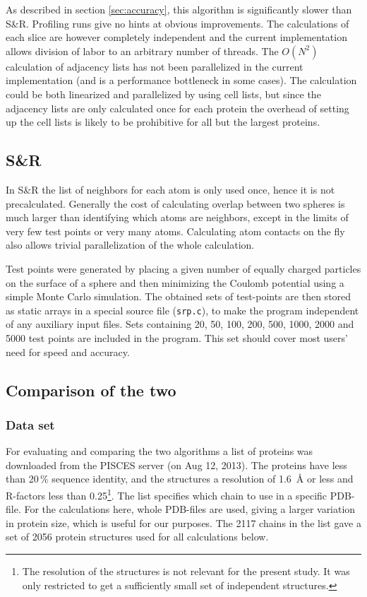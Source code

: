 \documentclass[a4paper,11pt]{article}
\begin{document}
As described in section \ref{sec:accuracy}, this algorithm is
significantly slower than S\&R. Profiling runs give no hints at
obvious improvements. The calculations of each slice are however
completely independent and the current implementation allows division
of labor to an arbitrary number of threads. The $O(N^2)$ calculation
of adjacency lists has not been parallelized in the current
implementation (and is a performance bottleneck in some cases). The
calculation could be both linearized and parallelized by using cell
lists, but since the adjacency lists are only calculated once for each
protein the overhead of setting up the cell lists is likely to be
prohibitive for all but the largest proteins.

\subsection{S\&R}

In S\&R the list of neighbors for each atom is only used once, hence
it is not precalculated. Generally the cost of calculating overlap
between two spheres is much larger than identifying which atoms are
neighbors, except in the limits of very few test points or very many
atoms. Calculating atom contacts on the fly also allows trivial
parallelization of the whole calculation.

Test points were generated by placing a given number of equally
charged particles on the surface of a sphere and then minimizing the
Coulomb potential using a simple Monte Carlo simulation. The obtained
sets of test-points are then stored as static arrays in a special
source file (\texttt{srp.c}), to make the program independent of any
auxiliary input files. Sets containing 20, 50, 100, 200, 500, 1000,
2000 and 5000 test points are included in the program. This set should
cover most users' need for speed and accuracy.

\subsection{Comparison of the two}\label{sec:compare}

\subsubsection{Data set}\label{sec:dataset}

For evaluating and comparing the two algorithms a list of proteins was
downloaded from the PISCES server \cite{PISCES} (on Aug 12, 2013). The
proteins have less than 20\,\% sequence identity, and the structures a
resolution of 1.6~Å or less and R-factors less than 0.25\footnote{The
  resolution of the structures is not relevant for the present
  study. It was only restricted to get a sufficiently small set of
  independent structures.}. The list specifies which chain to use in a
specific PDB-file. For the calculations here, whole PDB-files are
used, giving a larger variation in protein size, which is useful for
our purposes. The 2117 chains in the list gave a set of 2056 protein
structures used for all calculations below.
\end{document}
